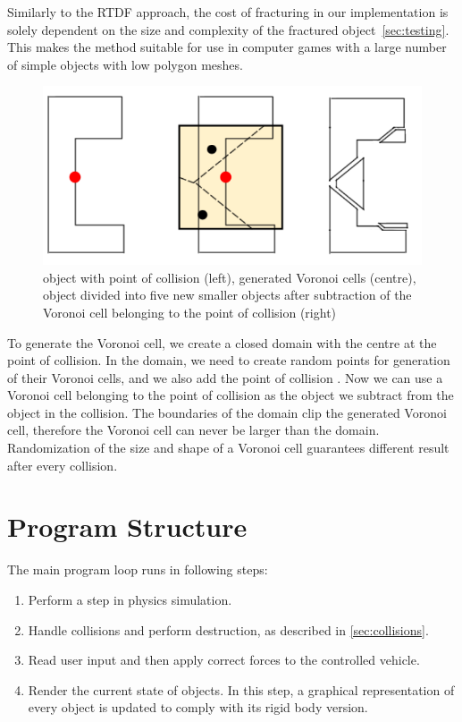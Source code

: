 Similarly to the RTDF approach, the cost of fracturing in our implementation is solely dependent on the size and complexity of the fractured object~\cref{sec:testing}. This makes the method suitable for use in computer games with a large number of simple objects with low polygon meshes.

\begin{figure}
        \centering
        \includegraphics[width=\textwidth]{img/subtractionProcess}
        \caption{object with point of collision (left), generated Voronoi cells (centre), object divided into five new smaller objects after subtraction of the Voronoi cell belonging to the point of collision (right)}
        \label{fig:subtraction}
\end{figure}

To generate the Voronoi cell, we create a closed domain with the centre at the point of collision. In the domain, we need  to create random points for generation of their Voronoi cells, and we also add the point of collision . Now  we can use a Voronoi cell belonging to the point of collision as the object we subtract from the object in the collision. The boundaries of the domain clip the generated Voronoi cell, therefore the Voronoi cell can never be larger than the domain. Randomization of the size and shape of a Voronoi cell guarantees different result after every collision.


\section{Program Structure}
The main program loop runs in following steps:
\begin{enumerate}
\item Perform a step in physics simulation. 
\item Handle collisions and perform destruction, as described in \cref{sec:collisions}.
\item Read user input and then apply correct forces to the controlled vehicle.
\item Render the current state of objects. In this step, a graphical representation of every object is updated to comply with its rigid body version.
\end{enumerate}

